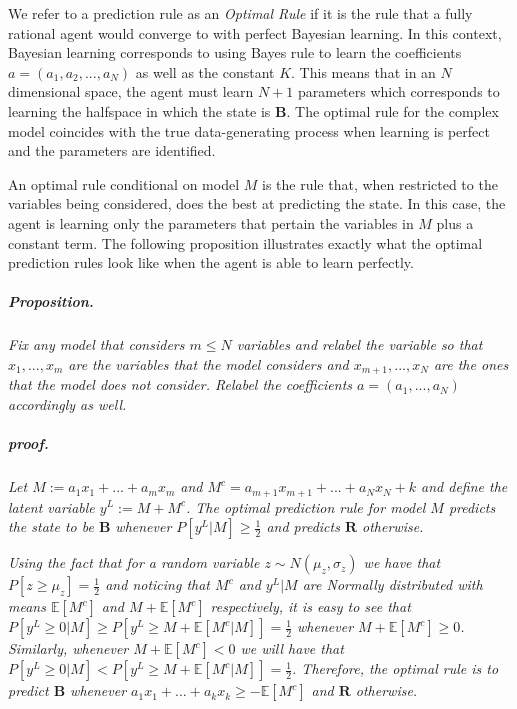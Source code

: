 \documentclass[
  12pt,
]{article}
\begin{document}
We refer to a prediction rule as an \emph{Optimal Rule} if it is the
rule that a fully rational agent would converge to with perfect Bayesian
learning. In this context, Bayesian learning corresponds to using Bayes
rule to learn the coefficients \(a = (a_1, a_2, ..., a_N)\) as well as
the constant \(K\). This means that in an \(N\) dimensional space, the
agent must learn \(N+1\) parameters which corresponds to learning the
halfspace in which the state is \textbf{B}. The optimal rule for the
complex model coincides with the true data-generating process when
learning is perfect and the parameters are identified.

An optimal rule conditional on model \(M\) is the rule that, when
restricted to the variables being considered, does the best at
predicting the state. In this case, the agent is learning only the
parameters that pertain the variables in \(M\) plus a constant term. The
following proposition illustrates exactly what the optimal prediction
rules look like when the agent is able to learn perfectly.

\hypertarget{proposition.}{%
\subparagraph{Proposition.}\label{proposition.}}

\emph{Fix any model that considers \(m\leq N\) variables and relabel the
variable so that \(x_1, ..., x_m\) are the variables that the model
considers and \(x_{m+1}, ..., x_N\) are the ones that the model does not
consider. Relabel the coefficients \(a = (a_1, ..., a_N)\) accordingly
as well.}

\hypertarget{proof.}{%
\subparagraph{proof.}\label{proof.}}

\emph{Let \(M:=a_1x_1+...+a_mx_m\) and
\(M^c = a_{m+1}x_{m+1}+...+a_Nx_N+k\) and define the latent variable
\(y^L := M + M^c\). The optimal prediction rule for model \(M\) predicts
the state to be \(\textbf{B}\) whenever \(P[y^L|M]\geq \frac{1}{2}\) and
predicts \(\textbf{R}\) otherwise.}

\emph{Using the fact that for a random variable
\(z\sim N(\mu_z, \sigma_z)\) we have that \(P[z\geq \mu_z]=\frac{1}{2}\)
and noticing that \(M^c\) and \(y^L|M\) are Normally distributed with
means \(\mathbb{E}[M^c]\) and \(M+\mathbb{E}[M^c]\) respectively, it is
easy to see that
\(P[y^L\geq 0 | M] \geq P[y^L\geq M+\mathbb{E}[M^c | M]]=\frac{1}{2}\)
whenever \(M+\mathbb{E}[M^c]\geq 0\). Similarly, whenever
\(M+\mathbb{E}[M^c]< 0\) we will have that
\(P[y^L\geq 0 | M] < P[y^L\geq M+\mathbb{E}[M^c | M]]=\frac{1}{2}\).
Therefore, the optimal rule is to predict \(\mathbf{B}\) whenever
\(a_1x_1+...+a_kx_k\geq -\mathbb{E}[M^c]\) and \(\textbf{R}\)
otherwise.}
\end{document}
